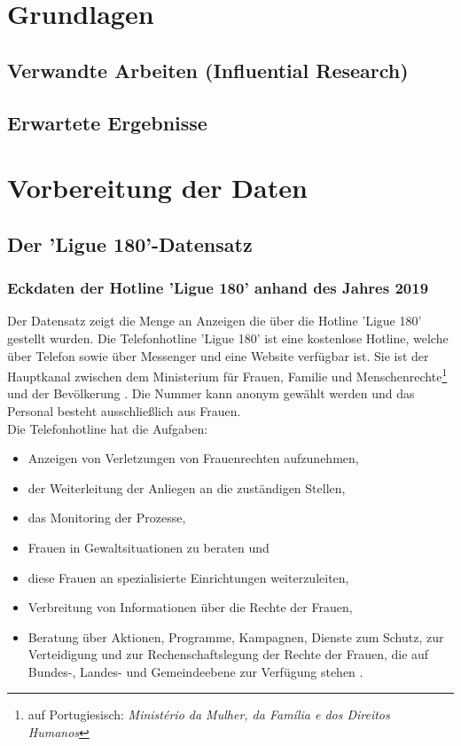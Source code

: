 \documentclass[12pt]{report}
\begin{document}
	\chapter{Grundlagen} 
	\section{Verwandte Arbeiten (Influential Research)} 
	\section{Erwartete Ergebnisse}
	\chapter{Vorbereitung der Daten}
	\section{Der 'Ligue 180'-Datensatz}
	\subsection{Eckdaten der Hotline 'Ligue 180' anhand des Jahres 2019}
	Der Datensatz zeigt die Menge an Anzeigen die über die Hotline  'Ligue 180' gestellt wurden. 	Die Telefonhotline 'Ligue 180' ist eine kostenlose Hotline, welche über Telefon sowie über Messenger und eine Website verfügbar ist. Sie ist der Hauptkanal zwischen dem Ministerium für Frauen, Familie und Menschenrechte\footnote{auf Portugiesisch: \textit{Ministério da Mulher, da Família e dos Direitos Humanos}} und der Bevölkerung \cite[S. 12]{BalancoLigue180.2020}. Die Nummer kann anonym gewählt werden und das Personal besteht ausschließlich aus Frauen.\\
	Die Telefonhotline hat die Aufgaben:
	\begin{itemize}
		\item Anzeigen von Verletzungen von Frauenrechten aufzunehmen,
		\item der Weiterleitung der Anliegen an die zuständigen Stellen,
		\item das Monitoring der Prozesse,
		\item Frauen in Gewaltsituationen zu beraten und
		\item diese Frauen an spezialisierte Einrichtungen weiterzuleiten,
		\item Verbreitung von Informationen über die Rechte der Frauen,
		\item Beratung über Aktionen, Programme, Kampagnen, Dienste zum Schutz, zur Verteidigung und zur Rechenschaftslegung der Rechte der Frauen, die auf Bundes-, Landes- und Gemeindeebene zur Verfügung stehen \cite[S. 12, 19]{BalancoLigue180.2020}.
	\end{itemize} 
	
\end{document}
